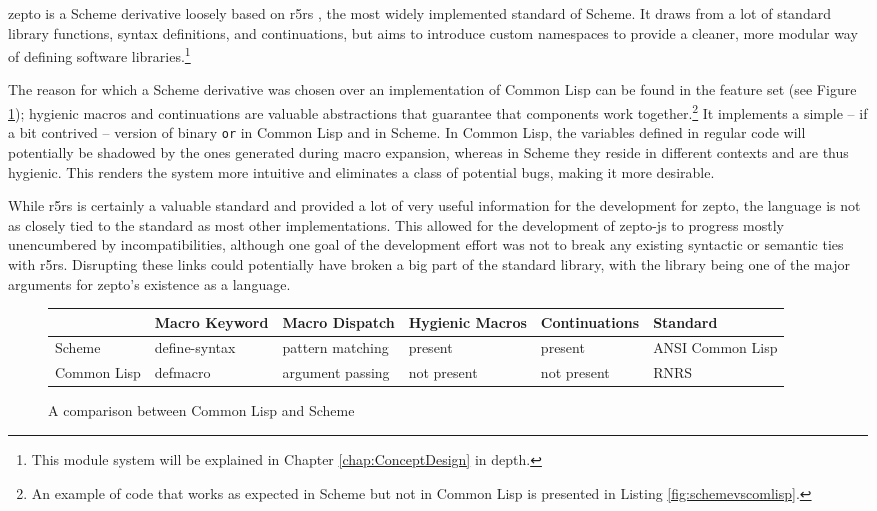 \documentclass[oneside,11pt,xetex]{scrbook}
\begin{document}
zepto is a Scheme derivative loosely based on \gls{r5rs} \parencite{R5RS}, the most
widely implemented standard of Scheme. It draws from a lot of standard library
functions, syntax definitions, and continuations, but aims to introduce custom namespaces
to provide a cleaner, more modular way of defining software libraries.\footnote{This module
system will be explained in Chapter \ref{chap:ConceptDesign} in depth.}

The reason for which a Scheme derivative was chosen over an implementation of Common Lisp
can be found in the feature set (see Figure \ref{fig:lispcomp}); hygienic macros and
continuations are valuable abstractions that guarantee that components work
together.\footnote{An example of code that works as expected in Scheme but not in
Common Lisp is presented in Listing \ref{fig:schemevscomlisp}.} It
implements a simple – if a bit contrived – version of binary \texttt{or} in Common Lisp and
in Scheme. In Common Lisp, the variables defined in regular code will potentially be
shadowed by the ones generated during macro expansion, whereas in Scheme they reside in
different contexts and are thus hygienic. This renders the system more intuitive and eliminates
a class of potential bugs, making it more desirable.

While \gls{r5rs} is certainly a valuable standard and provided a lot of very useful information
for the development for zepto, the language is not as closely tied to the standard as most other
implementations. This allowed for the development of zepto-js to progress mostly unencumbered by
incompatibilities, although one goal of the development effort was not to break any existing
syntactic or semantic ties with \gls{r5rs}. Disrupting these links could potentially have broken
a big part of the standard library, with the library being one of the major arguments for zepto's
existence as a language.

\begin{center}
\begin{figure}
  \begin{tabu}{| l | l | l | l | l | l |}
  \hline
  \rowfont{\footnotesize}
              & Macro Keyword & Macro Dispatch   & Hygienic Macros & Continuations & Standard\\ \hline
  \rowfont{\footnotesize}
  Scheme      & define-syntax & pattern matching & present         & present       & ANSI Common Lisp\\ \hline
  \rowfont{\footnotesize}
  Common Lisp & defmacro      & argument passing & not present     & not present   & RNRS\\ \hline
  \end{tabu}
  \caption{A comparison between Common Lisp and Scheme}
\label{fig:lispcomp}
\end{figure}
\end{center}
\end{document}
